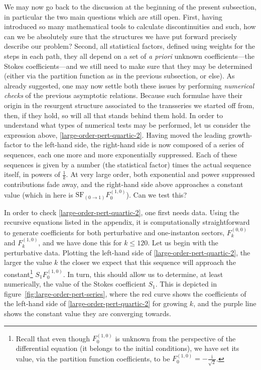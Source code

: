 \documentclass[11pt,a4paper]{article}
\newcommand{\rmi}{{\mathrm{i}}}
\begin{document}
We may now go back to the discussion at the beginning of the present subsection, in particular the two main questions which are still open. First, having introduced so many mathematical tools to calculate discontinuities and such, how can we be absolutely sure that the structures we have put forward precisely describe our problem? Second, all statistical factors, defined using weights for the steps in each path, they all depend on a set of \textit{a priori} unknown coefficients---the Stokes coefficients---and we still need to make sure that they may be determined (either via the partition function as in the previous subsection, or else). As already suggested, one may now settle both these issues by performing \textit{numerical checks} of the previous asymptotic relations. Because such formulae have their origin in the resurgent structure associated to the transseries we started off from, then, if they hold, so will all that stands behind them hold. In order to understand what types of numerical tests may be performed, let us consider the expression above, \eqref{large-order-pert-quartic-2}. Having moved the leading growth-factor to the left-hand side, the right-hand side is now composed of a series of sequences, each one more and more exponentially suppressed. Each of these sequences is given by a number (the statistical factor) times the actual sequence itself,  in powers of $\frac{1}{k}$. At very large order, both exponential and power suppressed contributions fade away, and the right-hand side above approaches a constant value (which in here is $\mathrm{SF}_{(0\rightarrow1)} F_0^{(1,0)}$). Can we test this?

In order to check \eqref{large-order-pert-quartic-2}, one first needs data. Using the recursive equations listed in the appendix, it is computationally straightforward to generate coefficients for both perturbative and one-instanton sectors, $F_k^{(0,0)}$ and $F_k^{(1,0)}$, and we have done this for $k\le 120$. Let us begin with the perturbative data. Plotting the left-hand side of \eqref{large-order-pert-quartic-2}, the larger the value $k$ the closer we expect that this sequence will approach the constant\footnote{Recall that even though $F_0^{(1,0)}$ is unknown from the perspective of the differential equation (it belongs to the initial conditions), we have set its value, via the partition function coefficients, to be $F_0^{(1,0)} = -\frac{\rmi}{\sqrt{2}}$.} $S_1 F_0^{(1,0)}$. In turn, this should allow us to determine, at least numerically, the value of the Stokes coefficient $S_1$. This is depicted in figure~\ref{fig:large-order-pert-series}, where the red curve shows the coefficients of the left-hand side of \eqref{large-order-pert-quartic-2} for growing $k$, and the purple line shows the constant value they are converging towards.
\end{document}
